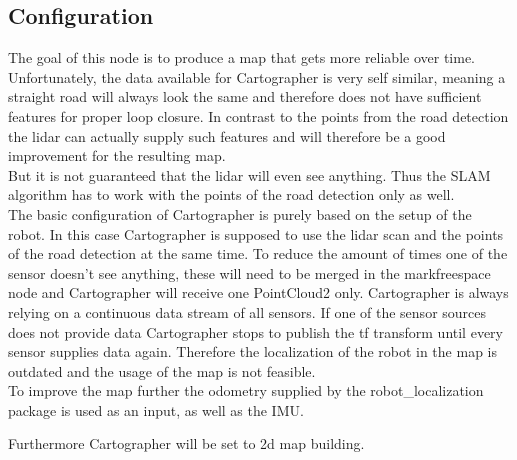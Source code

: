 \subsection{Configuration}
The goal of this node is to produce a map that gets more reliable over time.\\

Unfortunately, the data available for Cartographer is very self similar, meaning a straight road will always look the same and therefore does not have sufficient features for proper loop closure. In contrast to the points from the road detection the lidar can actually supply such features and will therefore be a good improvement for the resulting map.\\

But it is not guaranteed that the lidar will even see anything. Thus the SLAM algorithm has to work with the points of the road detection only as well.\\

The basic configuration of Cartographer is purely based on the setup of the robot. In this case Cartographer is supposed to use the lidar scan and the points of the road detection at the same time. To reduce the amount of times one of the sensor doesn't see anything, these will need to be merged in the markfreespace node and Cartographer will receive one PointCloud2 only. Cartographer is always relying on a continuous data stream of all sensors. If one of the sensor sources does not provide data Cartographer stops to publish the tf transform until every sensor supplies data again. Therefore the localization of the robot in the map is outdated and the usage of the map is not feasible.\\



To improve the map further the odometry supplied by the robot\_localization package is used as an input, as well as the IMU.

Furthermore Cartographer will be set to 2d map building.


